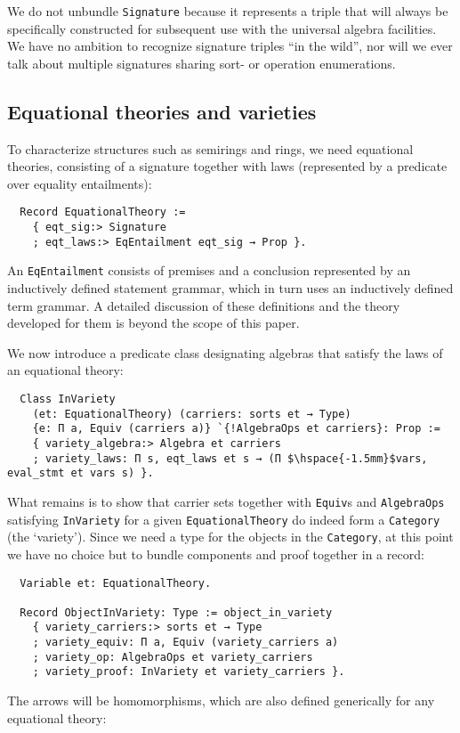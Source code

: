 \documentclass[a4paper,10pt,runningheads]{llncs}
\begin{document}
We do not unbundle \lstinline|Signature| because it represents a triple that will always be specifically constructed for subsequent use with the universal algebra facilities. We have no ambition to recognize signature triples ``in the wild'', nor will we ever talk about multiple signatures sharing sort- or operation enumerations.

\subsection{Equational theories and varieties}
\label{varieties}

To characterize structures such as semirings and rings, we need equational theories, consisting of a signature together with laws (represented by a predicate over equality entailments):
\begin{lstlisting}
  Record EquationalTheory :=
    { eqt_sig:> Signature
    ; eqt_laws:> EqEntailment eqt_sig → Prop }.
\end{lstlisting}
An \lstinline|EqEntailment| consists of premises and a conclusion represented by an inductively defined statement grammar, which in turn uses an inductively defined term grammar. A detailed discussion of these definitions and the theory developed for them is beyond the scope of this paper.

We now introduce a predicate class designating algebras that satisfy the laws of an equational theory:
\begin{lstlisting}
  Class InVariety
    (et: EquationalTheory) (carriers: sorts et → Type)
    {e: Π a, Equiv (carriers a)} `{!AlgebraOps et carriers}: Prop :=
    { variety_algebra:> Algebra et carriers
    ; variety_laws: Π s, eqt_laws et s → (Π $\hspace{-1.5mm}$vars, eval_stmt et vars s) }.
\end{lstlisting}

What remains is to show that carrier sets together with \lstinline|Equiv|s and \lstinline|AlgebraOps| satisfying \lstinline|InVariety| for a given \lstinline|EquationalTheory| do indeed form a \lstinline|Category| (the `variety'). Since we need a type for the objects in the \lstinline|Category|, at this point we have no choice but to bundle components and proof together in a record:
\begin{lstlisting}
  Variable et: EquationalTheory.

  Record ObjectInVariety: Type := object_in_variety
    { variety_carriers:> sorts et → Type
    ; variety_equiv: Π a, Equiv (variety_carriers a)
    ; variety_op: AlgebraOps et variety_carriers
    ; variety_proof: InVariety et variety_carriers }.
\end{lstlisting}
The arrows will be homomorphisms, which are also defined generically for any equational theory:
\end{document}
